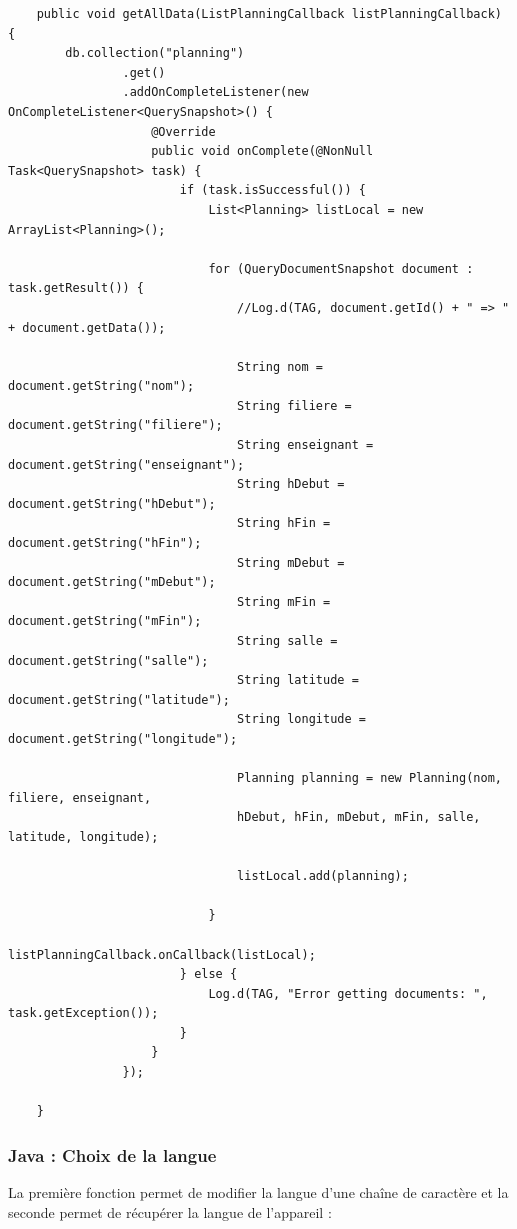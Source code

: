 \documentclass{article}
\begin{document}
\begin{verbatim}
    public void getAllData(ListPlanningCallback listPlanningCallback) {
        db.collection("planning")
                .get()
                .addOnCompleteListener(new OnCompleteListener<QuerySnapshot>() {
                    @Override
                    public void onComplete(@NonNull Task<QuerySnapshot> task) {
                        if (task.isSuccessful()) {
                            List<Planning> listLocal = new ArrayList<Planning>();

                            for (QueryDocumentSnapshot document : task.getResult()) {
                                //Log.d(TAG, document.getId() + " => " + document.getData());

                                String nom = document.getString("nom");
                                String filiere = document.getString("filiere");
                                String enseignant = document.getString("enseignant");
                                String hDebut = document.getString("hDebut");
                                String hFin = document.getString("hFin");
                                String mDebut = document.getString("mDebut");
                                String mFin = document.getString("mFin");
                                String salle = document.getString("salle");
                                String latitude = document.getString("latitude");
                                String longitude = document.getString("longitude");

                                Planning planning = new Planning(nom, filiere, enseignant,
                                hDebut, hFin, mDebut, mFin, salle, latitude, longitude);

                                listLocal.add(planning);

                            }
                            listPlanningCallback.onCallback(listLocal);
                        } else {
                            Log.d(TAG, "Error getting documents: ", task.getException());
                        }
                    }
                });

    }
\end{verbatim}

\subsubsection{Java : Choix de la langue}
La première fonction permet de modifier la langue d'une chaîne de caractère et la seconde permet de récupérer la langue de l'appareil :
\end{document}
